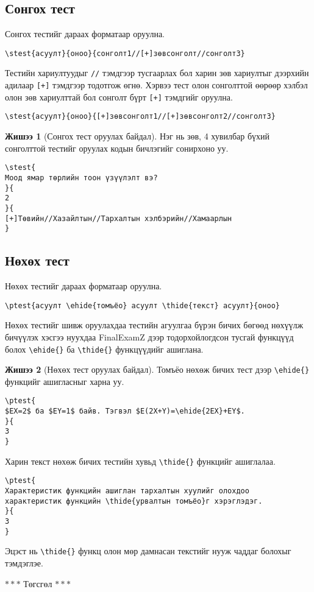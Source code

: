 \documentclass[10pt]{article}
\theoremstyle{definition}
\newtheorem{example}{Жишээ}
\begin{document}
\subsection{Сонгох тест}

Сонгох тестийг дараах форматаар оруулна.
\begin{verbatim}
\stest{асуулт}{оноо}{сонголт1//[+]зөвсонголт//сонголт3}
\end{verbatim}
Тестийн хариултуудыг \texttt{//} тэмдгээр тусгаарлах бол харин зөв хариултыг дээрхийн адилаар \texttt{[+]} тэмдгээр тодотгож өгнө. Хэрвээ тест олон сонголттой өөрөөр хэлбэл олон зөв хариулттай бол сонголт бүрт \texttt{[+]} тэмдгийг оруулна.
\begin{verbatim}
\stest{асуулт}{оноо}{[+]зөвсонголт1//[+]зөвсонголт2//сонголт3}
\end{verbatim}

\begin{example}[Сонгох тест оруулах байдал]
Нэг нь зөв, 4 хувилбар бүхий сонголттой тестийг оруулах кодын бичлэгийг сонирхоно уу.
\begin{verbatim}
\stest{
Моод ямар төрлийн тоон үзүүлэлт вэ?
}{
2
}{
[+]Төвийн//Хазайлтын//Тархалтын хэлбэрийн//Хамаарлын
}
\end{verbatim}
\end{example}

\subsection{Нөхөх тест}

Нөхөх тестийг дараах форматаар оруулна.
\begin{verbatim}
\ptest{асуулт \ehide{томъёо} асуулт \thide{текст} асуулт}{оноо}
\end{verbatim}
Нөхөх тестийг шивж оруулахдаа тестийн агуулгаа бүрэн бичих бөгөөд нөхүүлж бичүүлэх хэсгээ нуухдаа FinalExamZ дээр тодорхойлогдсон тусгай функцүүд болох \verb|\ehide{}| ба \verb|\thide{}| функцүүдийг ашиглана.

\begin{example}[Нөхөх тест оруулах байдал]
Томъёо нөхөж бичих тест дээр \verb|\ehide{}| функцийг ашигласныг харна уу.
\begin{verbatim}
\ptest{
$EX=2$ ба $EY=1$ байв. Тэгвэл $E(2X+Y)=\ehide{2EX}+EY$.
}{
3
}
\end{verbatim}
Харин текст нөхөж бичих тестийн хувьд \verb|\thide{}| функцийг ашиглалаа.
\begin{verbatim}
\ptest{
Характеристик функцийн ашиглан тархалтын хуулийг олохдоо 
характеристик функцийн \thide{урвалтын томъёо}г хэрэглэдэг.
}{
3
}
\end{verbatim}
\end{example}

Эцэст нь \verb|\thide{}| функц олон мөр дамнасан текстийг нууж чаддаг болохыг тэмдэглэе.

\begin{center}
 $\ast\ast\ast$ Төгсгөл $\ast\ast\ast$
\end{center}
\end{document}
